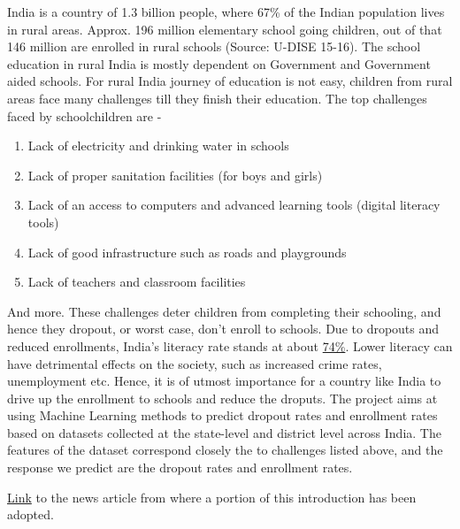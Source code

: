 \documentclass{article}
\begin{document}
India is a country of 1.3 billion people, where 67\% of the Indian population lives in rural areas. Approx. 196 million elementary school going children, out of that 146 million are enrolled in rural schools (Source: U-DISE 15-16). The school education in rural India is mostly dependent on Government and Government aided schools. For rural India journey of education is not easy, children from rural areas face many challenges till they finish their education.  
The top challenges faced by schoolchildren are - 
\begin{enumerate}[noitemsep]
\item Lack of electricity and drinking water in schools
\item Lack of proper sanitation facilities (for boys and girls)
\item Lack of an access to computers and advanced learning tools (digital literacy tools)
\item Lack of good infrastructure such as roads and playgrounds
\item Lack of teachers and classroom facilities
\end{enumerate}
And more. These challenges deter children from completing their schooling, and hence they dropout, or worst case, don't enroll to schools. Due to dropouts and reduced enrollments, India's literacy rate stands at about \href{https://data.worldbank.org/indicator/SE.ADT.LITR.ZS?locations=IN} {74\%}. Lower literacy can have detrimental effects on the society, such as increased crime rates, unemployment etc. Hence, it is of utmost importance for a country like India to drive up the enrollment to schools and reduce the droputs. The project aims at using Machine Learning methods to predict dropout rates and enrollment rates based on datasets collected at the state-level and district level across India. The features of the dataset correspond closely the to challenges listed above, and the response we predict are the dropout rates and enrollment rates. 

\href{https://www.indiatoday.in/education-today/featurephilia/story/challenges-of-rural-students-in-india-1703143-2020-07-22}{Link} to the news article from where a portion of this introduction has been adopted. 
\end{document}
